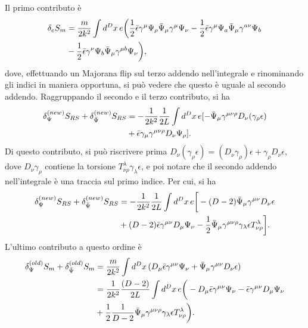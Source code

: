 Il primo contributo è
\begin{equation}
    \begin{split}
        \delta_eS_m &= \frac{m}{2k^2}\int d^Dx\,e\bigg(\frac{1}{2}\bar{\epsilon}\gamma^\mu\Psi_\rho\bar{\Psi}_\mu\gamma^\mu\Psi_\nu - \frac{1}{2}\bar{\epsilon}\gamma^\mu\Psi_a\bar{\Psi}_\mu\gamma^{a\nu}\Psi_b \\
        &- \frac{1}{2}\bar{\epsilon}\gamma^\nu\Psi_b\bar{\Psi}_\mu\gamma^{\mu b}\Psi_\nu\bigg),
    \end{split}
\end{equation}
dove, effettuando un Majorana flip sul terzo addendo nell'integrale e rinominando gli indici in maniera opportuna, si può vedere che questo è uguale al secondo addendo. Raggruppando il secondo e il terzo contributo, si ha 
\begin{equation}
    \begin{split}
        \delta_{\Psi}^{(new)}S_{RS} + \delta_{\bar{\Psi}}^{(new)}S_{RS} &= -\frac{1}{2k^2}\frac{1}{2L}\int d^Dx\,e[-\bar{\Psi}_\mu\gamma^{\mu\nu\rho}D_\nu(\gamma_\rho\epsilon) \\
        &+ \bar{\epsilon}\gamma_\mu\gamma^{\mu\nu\rho}D_\nu\Psi_\rho].
    \end{split}
\end{equation}
Di questo contributo, si può riscrivere prima $D_\nu(\gamma_\rho\epsilon) = (D_\nu\gamma_\rho)\epsilon + \gamma_\rho D_\nu\epsilon$, dove $D_\nu\gamma_\rho$ contiene la torsione $T_{\nu\rho}^\lambda\gamma_\lambda\epsilon$, e poi notare che il secondo addendo nell'integrale è una traccia sul primo indice. Per cui, si ha 
\begin{equation}
    \begin{split}
        \delta_{\Psi}^{(new)}S_{RS} + \delta_{\bar{\Psi}}^{(new)}S_{RS} &= -\frac{1}{2k^2}\frac{1}{2L}\int d^Dx\,e\bigg[-(D - 2)\bar{\Psi}_\mu\gamma^{\mu\nu}D_\nu\epsilon \\
        &+ (D - 2)\bar{\epsilon}\gamma^{\mu\nu}D_\mu\Psi_\nu - \frac{1}{2}\bar{\Psi}_\mu\gamma^{\mu\nu\rho}\gamma_\lambda\epsilon T_{\nu\rho}^\lambda\bigg].
    \end{split}
\end{equation}
L'ultimo contributo a questo ordine è 
\begin{equation}
    \begin{split}
        \delta_\Psi^{(old)}S_m + \delta_{\bar{\Psi}}^{(old)}S_m &= \frac{m}{2k^2}\int d^Dx\,(D_\mu\bar{\epsilon}\gamma^{\mu\nu}\Psi_\nu + \bar{\Psi}_\mu\gamma^{\mu\nu}D_\nu\epsilon) \\
        &= \frac{1}{2k^2}\frac{(D - 2)}{2L}\int d^Dx\,e\bigg(-D_\mu\bar{\epsilon}\gamma^{\mu\nu}\Psi_\nu - \bar{\epsilon}\gamma^{\mu\nu}D_\mu\Psi_\nu \\
        &+ \frac{1}{2}\frac{1}{D - 2}\bar{\Psi}_\mu\gamma^{\mu\nu\rho}\gamma_\lambda \epsilon T_{\nu\rho}^\lambda\bigg).
    \end{split}
\end{equation}
